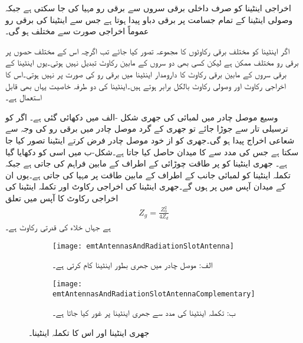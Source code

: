 اخراجی اینٹینا کو صرف داخلی برقی سروں سے برقی رو مہیا کی جا سکتی ہے جبکہ وصولی اینٹینا کے تمام جسامت پر برقی دباو پیدا ہوتا ہے جس سے اینٹینا کی برقی رو عموماً اخراجی صورت سے مختلف ہو گی۔

اگر اینٹینا کو مختلف برقی رکاوٹوں کا مجموعہ تصور کیا جائے تب اگرچہ اس کے مختلف حصوں پر برقی رو مختلف ممکن ہے لیکن کسی بھی دو سروں کے مابین رکاوٹ تبدیل نہیں ہوتی۔یوں اینٹینا کے برقی سروں کے مابین برقی رکاوٹ کا دارومدار اینٹینا میں برقی رو کی صورت پر نہیں ہوتی۔اس کا اخراجی رکاوٹ اور وصولی رکاوٹ بالکل برابر ہوتے ہیں۔اینٹینا کی دو طرفہ خاصیت یہاں بھی قابل استعمال ہے۔

وسیع موصل چادر میں  لمبائی کی جھری شکل -الف میں دکھائی گئی ہے۔ اگر  کو ترسیلی تار سے جوڑا جائے تو جھری کے گرد موصل چادر میں برقی رو کی وجہ سے شعاعی اخراج پیدا ہو گی۔جھری کو از خود موصل چادر فرض کرتے  اینٹینا تصور کیا جا سکتا ہے جس کی مدد سے   کا میدان حاصل کیا جاتا ہے۔شکل-ب میں اسی  کو دکھایا گیا ہے۔ جھری اینٹینا کو  پر طاقت چوڑائی کے اطراف کے مابین فراہم کی جاتی ہے جبکہ تکملہ اینٹینا کو لمبائی جانب کے اطراف کے مابین طاقت  پر مہیا کی جاتی ہے۔یوں ان کے میدان آپس میں  پر ہوں گے۔جھری اینٹینا کی اخراجی رکاوٹ  اور تکملہ اینٹینا کی اخراجی رکاوٹ  کا آپس میں تعلق
\begin{align}
Z_g = \frac{Z_0^2}{4 Z_{d}}
\end{align}
ہے جہاں  خلاء کی قدرتی رکاوٹ ہے۔

\begin{figure}
\centering
\begin{subfigure}{0.4\textwidth}
\centering
\texttt{[image: emtAntennasAndRadiationSlotAntenna]}
\caption*{الف: موصل چادر میں جھری بطور اینٹینا کام کرتی ہے۔}
\end{subfigure}%
%
\begin{subfigure}{0.4\textwidth}
\centering
\texttt{[image: emtAntennasAndRadiationSlotAntennaComplementary]}
\caption*{ب: تکملہ اینٹینا کی مدد سے جھری اینٹینا پر غور کیا جاتا ہے۔}
\end{subfigure}%
\caption{جھری اینٹینا اور اس کا تکملہ اینٹینا۔}
\label{شکل_اینٹینا_جھری_اینٹینا}
\end{figure}

